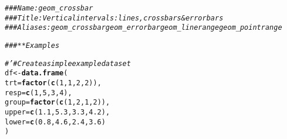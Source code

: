 \documentclass[a4paper,titlepage]{tufte-handout}\usepackage[]{graphicx}\usepackage[]{color}
\makeatletter
\newcommand{\hlnum}[1]{\textcolor[rgb]{0.686,0.059,0.569}{#1}}%
\newcommand{\hlcom}[1]{\textcolor[rgb]{0.678,0.584,0.686}{\textit{#1}}}%
\newcommand{\hlstd}[1]{\textcolor[rgb]{0.345,0.345,0.345}{#1}}%
\newcommand{\hlkwb}[1]{\textcolor[rgb]{0.69,0.353,0.396}{#1}}%
\newcommand{\hlkwc}[1]{\textcolor[rgb]{0.333,0.667,0.333}{#1}}%
\newcommand{\hlkwd}[1]{\textcolor[rgb]{0.737,0.353,0.396}{\textbf{#1}}}%
\newenvironment{kframe}{%
 \def\at@end@of@kframe{}%
 \ifinner\ifhmode%
  \def\at@end@of@kframe{\end{minipage}}%
  \begin{minipage}{\columnwidth}%
 \fi\fi%
 \def\FrameCommand##1{\hskip\@totalleftmargin \hskip-\fboxsep
 \colorbox{shadecolor}{##1}\hskip-\fboxsep
     \hskip-\linewidth \hskip-\@totalleftmargin \hskip\columnwidth}%
 \MakeFramed {\advance\hsize-\width
   \@totalleftmargin\z@ \linewidth\hsize
   \@setminipage}}%
 {\par\unskip\endMakeFramed%
 \at@end@of@kframe}
\newenvironment{knitrout}{}{} %
\makeatother
\begin{document}
\begin{knitrout}
\color{fgcolor}\begin{kframe}
\begin{alltt}
\hlcom{### Name: geom_crossbar}
\hlcom{### Title: Vertical intervals: lines, crossbars & errorbars}
\hlcom{### Aliases: geom_crossbar geom_errorbar geom_linerange geom_pointrange}

\hlcom{### ** Examples}

\hlcom{#' # Create a simple example dataset}
\hlstd{df} \hlkwb{<-} \hlkwd{data.frame}\hlstd{(}
  \hlkwc{trt} \hlstd{=} \hlkwd{factor}\hlstd{(}\hlkwd{c}\hlstd{(}\hlnum{1}\hlstd{,} \hlnum{1}\hlstd{,} \hlnum{2}\hlstd{,} \hlnum{2}\hlstd{)),}
  \hlkwc{resp} \hlstd{=} \hlkwd{c}\hlstd{(}\hlnum{1}\hlstd{,} \hlnum{5}\hlstd{,} \hlnum{3}\hlstd{,} \hlnum{4}\hlstd{),}
  \hlkwc{group} \hlstd{=} \hlkwd{factor}\hlstd{(}\hlkwd{c}\hlstd{(}\hlnum{1}\hlstd{,} \hlnum{2}\hlstd{,} \hlnum{1}\hlstd{,} \hlnum{2}\hlstd{)),}
  \hlkwc{upper} \hlstd{=} \hlkwd{c}\hlstd{(}\hlnum{1.1}\hlstd{,} \hlnum{5.3}\hlstd{,} \hlnum{3.3}\hlstd{,} \hlnum{4.2}\hlstd{),}
  \hlkwc{lower} \hlstd{=} \hlkwd{c}\hlstd{(}\hlnum{0.8}\hlstd{,} \hlnum{4.6}\hlstd{,} \hlnum{2.4}\hlstd{,} \hlnum{3.6}\hlstd{)}
\hlstd{)}


\end{alltt}
\end{kframe}
\end{knitrout}
\end{document}
